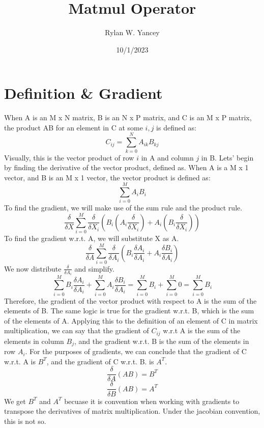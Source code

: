 \documentclass{article}
\title{Matmul Operator}
\author{Rylan W. Yancey}
\date{10/1/2023}
\begin{document}
    \maketitle
    \section*{Definition \& Gradient}
            When A is an M x N matrix, B is an N x P matrix, and C is an M x P matrix, 
        the product AB for an element in C at some $i,j$ is defined as: 
        $$C_{ij} = \sum_{k=0}^{N} A_{ik}B_{kj}$$
        Visually, this is the vector product of row $i$ in A and column $j$ in B. Lets' begin by finding
        the derivative of the vector product, defined as.  When A is a M x 1 vector, and B is an M x 1 vector, the vector product
        is defined as: 
        $$\sum_{i=0}^{M} A_i B_i$$
        To find the gradient, we will make use of the sum rule and the product rule. 
        $$\frac{\delta}{\delta{X}}\sum_{i=0}^{M} \frac{\delta}{\delta{X_i}}(B_i (A_i \frac{\delta}{\delta{X_i}}) + A_i (B_i \frac{\delta}{\delta{X_i}}))$$
        To find the gradient w.r.t. A, we will substitute X as A. 
        $$\frac{\delta}{\delta{A}}\sum_{i=0}^{M} \frac{\delta}{\delta{A_i}}(B_i\frac{\delta{A_i}}{\delta{A_i}} + A_i\frac{\delta{B_i}}{\delta{A_i}})$$
        We now distribute $\frac{\delta}{\delta{A_i}}$ and simplify. 
        $$\sum_{i=0}^{M} B_i\frac{\delta{A_i}}{\delta{A_i}} + \sum_{i=0}^{M} A_i\frac{\delta{B_i}}{\delta{A_i}} = 
        \sum_{i=0}^{M} B_i + \sum_{i=0}^{M} 0 = \sum_{i=0}^{M} B_i$$
        Therefore, the gradient of the vector product with respect to A is the sum of the elements of B. The same logic is true for the gradient w.r.t.
        B, which is the sum of the elements of A. Applying this to the definition of an element of C in matrix multiplication, we can say that the
        gradient of $C_{ij}$ w.r.t A is the sum of the elements in column $B_j$, and the gradient w.r.t. B is the sum of the elements in row $A_i$.
        For the purposes of gradients, we can conclude that the gradient of C w.r.t. A is $B^T$, and the gradient of C w.r.t. B. is $A^T$.
        $$\frac{\delta}{\delta{A}}(AB) = B^T$$
        $$\frac{\delta}{\delta{B}}(AB) = A^T$$
        We get $B^T$ and $A^T$ becuase it is convention when working with gradients to transpose the derivatives of matrix multiplication. Under the
        jacobian convention, this is not so. 
\end{document}
